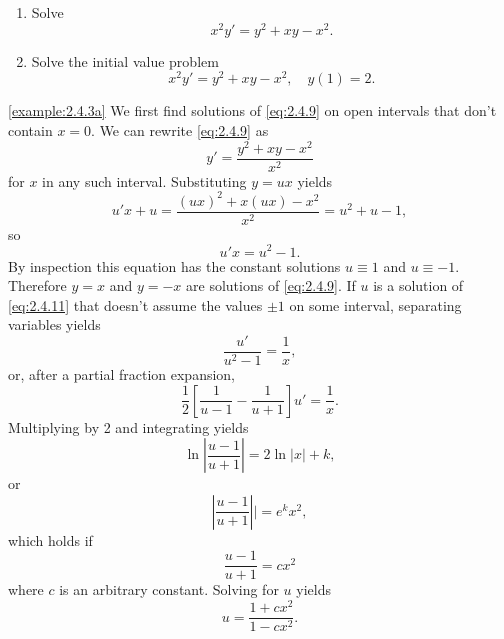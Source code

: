 \documentclass{ximera}
\begin{document}
\begin{example}\label{example:2.4.3}

\begin{enumerate}
\item\label{example:2.4.3a} %
Solve
\begin{equation} \label{eq:2.4.9}
x^2y'=y^2+xy-x^2.
\end{equation}

\item\label{example:2.4.3b} %
Solve the initial value problem
\begin{equation} \label{eq:2.4.10}
x^2y'=y^2+xy-x^2, \quad y(1)=2.
\end{equation}
\end{enumerate}

\begin{explanation}
\ref{example:2.4.3a} We first find solutions of \eqref{eq:2.4.9} on open intervals that don't
contain $x=0$. We can rewrite \eqref{eq:2.4.9} as
$$
y'=\frac{y^2+xy-x^2}{x^2}
$$
for $x$ in any such interval. Substituting $y=ux$ yields
$$
u'x+u =\frac{(ux)^2+x(ux)-x^2}{x^2}
= u^2+u-1,
$$
so
\begin{equation} \label{eq:2.4.11}
u'x=u^2-1.
\end{equation}
By inspection this equation has the constant solutions $u\equiv1$ and
$u\equiv-1$. Therefore $y=x$ and $y=-x$ are solutions of
\eqref{eq:2.4.9}. If $u$ is a solution of \eqref{eq:2.4.11} that doesn't
assume the values $\pm 1$ on some interval,  separating variables
yields
$$
\frac{u'}{u^2-1}=\frac{1}{x},
$$
 or, after a partial fraction expansion,
$$
{\frac{1}{2}}\left[\frac{1}{u-1}-\frac{1}{u+1}\right]u'=
\frac{1}{x}.
$$
 Multiplying by 2 and integrating yields
$$
\ln\left|\frac{u-1}{u+1}\right| =2 \ln |x|+k,
$$
 or
$$
\left|\frac{u-1}{u+1}\right||=e^kx^2,
$$
which holds if
\begin{equation} \label{eq:2.4.12}
\frac{u-1}{u+1}=cx^2
\end{equation}
where $c$ is an arbitrary constant.
  Solving for $u$ yields
$$
u =\frac{1+cx^2}{1-cx^2}.
$$

\begin{center}
\end{center}

  

\end{explanation}
\end{example}
\end{document}
